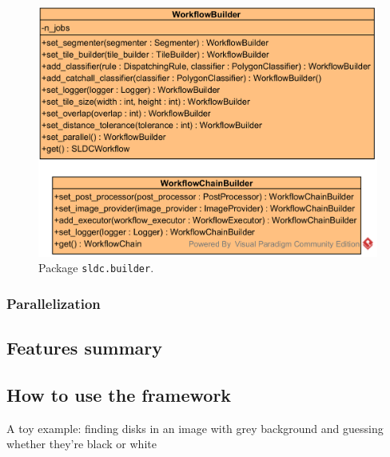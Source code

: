 \begin{figure}
	\center
	\includegraphics[scale=0.75]{image/uml_builder.png}
	\caption{Package \texttt{sldc.builder}.}
	\label{fig:uml_builder}
\end{figure}
 
\subsubsection{Parallelization}
\label{sssec:work_parallel}

\subsection{Features summary}

\subsection{How to use the framework}
\label{ssec:work_toy_example}
A toy example: finding disks in an image with grey background and guessing whether they're black or white 
